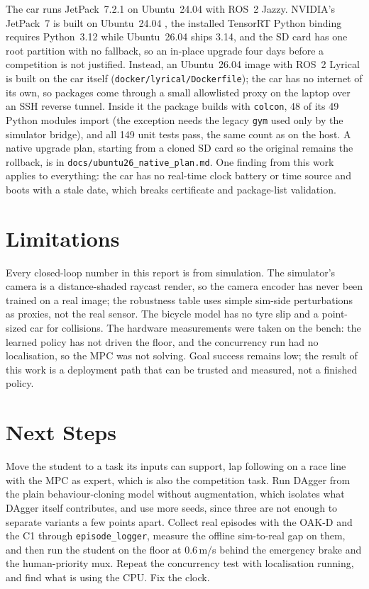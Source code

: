 \documentclass[12pt]{article}
\begin{document}
The car runs JetPack~7.2.1 on Ubuntu~24.04 with ROS~2 Jazzy. NVIDIA's JetPack~7 is built on
Ubuntu~24.04 \cite{jetpack}, the installed TensorRT Python binding requires Python~3.12 while
Ubuntu~26.04 ships 3.14, and the SD card has one root partition with no fallback, so an in-place
upgrade four days before a competition is not justified. Instead, an Ubuntu~26.04 image with ROS~2
Lyrical \cite{roslyrical} is built on the car itself (\texttt{docker/lyrical/Dockerfile}); the car
has no internet of its own, so packages come through a small allowlisted proxy on the laptop over
an SSH reverse tunnel. Inside it the package builds with \texttt{colcon}, 48 of its 49 Python
modules import (the exception needs the legacy \texttt{gym} used only by the simulator bridge),
and all 149 unit tests pass, the same count as on the host. A native upgrade plan, starting from a
cloned SD card so the original remains the rollback, is in \texttt{docs/ubuntu26\_native\_plan.md}.
One finding from this work applies to everything: the car has no real-time clock battery or time
source and boots with a stale date, which breaks certificate and package-list validation.

\section*{Limitations}

Every closed-loop number in this report is from simulation. The simulator's camera is a
distance-shaded raycast render, so the camera encoder has never been trained on a real image;
the robustness table uses simple sim-side perturbations as proxies, not the real sensor. The
bicycle model has no tyre slip and a point-sized car for collisions. The hardware measurements
were taken on the bench: the learned policy has not driven the floor, and the concurrency run had
no localisation, so the MPC was not solving. Goal success remains low; the result of this work is
a deployment path that can be trusted and measured, not a finished policy.

\section*{Next Steps}

Move the student to a task its inputs can support, lap following on a race line with the MPC as
expert, which is also the competition task. Run DAgger from the plain behaviour-cloning model
without augmentation, which isolates what DAgger itself contributes, and use more seeds, since
three are not enough to separate variants a few points apart. Collect real episodes with the OAK-D and the C1
through \texttt{episode\_logger}, measure the offline sim-to-real gap on them, and then run the
student on the floor at 0.6\,m/s behind the emergency brake and the human-priority mux. Repeat
the concurrency test with localisation running, and find what is using the CPU. Fix the clock.
\end{document}
